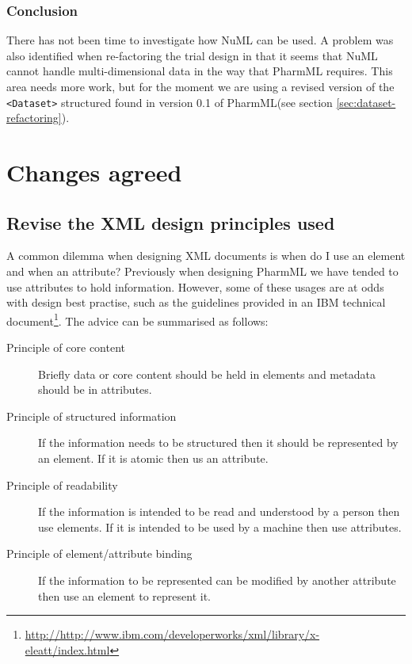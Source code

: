 \documentclass[a4paper,10pt]{article}
\newcommand{\pharmml}{PharmML\xspace}
\newcommand{\xelem}[1]{\texttt{<#1>}\index{XML Element!\texttt{<#1>}}}
\newcommand{\watchout}{\marginpar{\hspace*{34pt}\raisebox{-0.5ex}{\Large\ding{43}}}}
\begin{document}
\subsubsection{Conclusion}

\watchout There has not been time to investigate how NuML can be used. A problem
was also identified when re-factoring the trial design in that it
seems that NuML cannot handle multi-dimensional data in the way that
\pharmml requires. This area needs more work, but for the moment we
are using a revised version of the \xelem{Dataset} structured found in
version 0.1 of \pharmml (see section \ref{sec:dataset-refactoring}).

\section{Changes agreed}

\subsection{Revise the XML design principles used}

A common dilemma when designing XML documents is when do I use an
element and when an attribute? Previously when designing \pharmml we
have tended to use attributes to hold information. However, some of
these usages are at odds with design best practise, such as the guidelines provided in an IBM technical
document\footnote{\url{http://http://www.ibm.com/developerworks/xml/library/x-eleatt/index.html}}. The
advice can be summarised as follows:

\begin{description}
\item[Principle of core content] Briefly data or core content should
  be held in elements and metadata should be in attributes.
\item[Principle of structured information] If the information needs to
  be structured then it should be represented by an element. If it is
  atomic then us an attribute.
\item[Principle of readability] If the information is intended to be
  read and understood by a person then use elements. If it is intended
  to be used by a machine then use attributes.
\item[Principle of element/attribute binding] If the information to be
  represented can be modified by another attribute then use an element
  to represent it.
\end{description}
\end{document}
